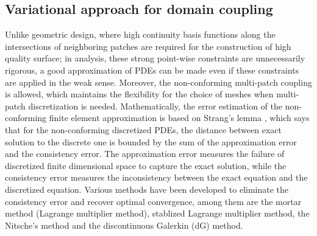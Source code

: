 \documentclass[preprint,12pt]{elsarticle}
\theoremstyle{remark}
\begin{document}
\subsection{Variational approach for domain coupling}
Unlike geometric design, where high continuity basis functions along the intersections of neighboring patches are required for the construction of high quality surface; in analysis, these strong point-wise constraints are unnecessarily rigorous, a good approximation of PDEs can be made even if these constraints are applied in the weak sense. Moreover, the non-conforming multi-patch coupling is allowed, which maintains the flexibility for the choice of meshes when multi-patch discretization is needed. Mathematically, the error estimation of the non-conforming finite element approximation is based on Strang's lemma \cite{brenner_mathematical_2007,strang_analysis_2008}, which says that for the non-conforming discretized PDEs, the distance between exact solution to the discrete one is bounded by the sum of the approximation error and the consistency error. The approximation error measures the failure of discretized finite dimensional space to capture the exact solution, while the consistency error measures the inconsistency between the exact equation and the discretized equation. Various methods have been developed to eliminate the consistency error and recover optimal convergence, among them are the mortar method (Lagrange multiplier method), stablized Lagrange multiplier method, the Nitsche's method and the discontinuous Galerkin (dG) method.\par
\end{document}

